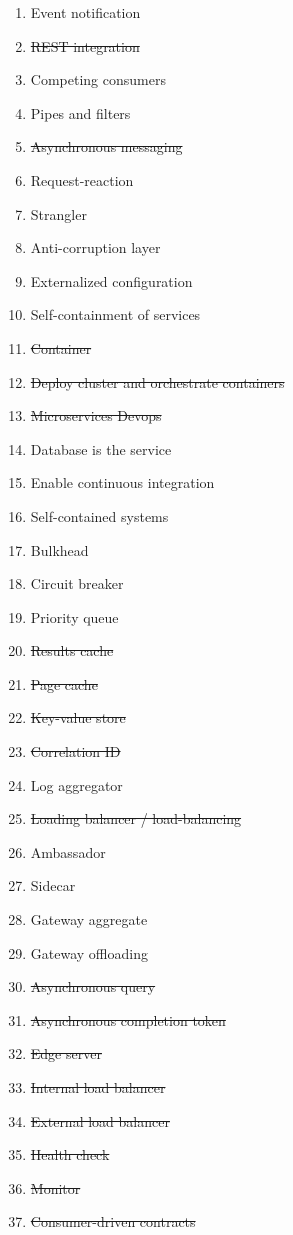 \documentclass{article}
\theoremstyle{mytheoremstyle}
\theoremstyle{mytheoremstyle}
\theoremstyle{myproblemstyle}
\begin{document}
\begin{enumerate}
  \item Event notification 
  \item \sout{REST integration} 
  \item Competing consumers 
  \item Pipes and filters 
  \item \sout{Asynchronous messaging} 
  \item Request-reaction 
  \item Strangler 
  \item Anti-corruption layer 
  \item Externalized configuration 
  \item Self-containment of services
  \item \sout{Container} 
  \item \sout{Deploy cluster and orchestrate containers} 
  \item \sout{Microservices Devops} 
  \item Database is the service
  \item Enable continuous integration 
  \item Self-contained systems 
  \item Bulkhead 
  \item Circuit breaker 
  \item Priority queue 
  \item \sout{Results cache} 
  \item \sout{Page cache} 
  \item \sout{Key-value store} 
  \item \sout{Correlation ID} 
  \item Log aggregator 
  \item \sout{Loading balancer / load-balancing}  
  \item Ambassador 
  \item Sidecar 
  \item Gateway aggregate 
  \item Gateway offloading 
  \item \sout{Asynchronous query} 
  \item \sout{Asynchronous completion token}
  \item \sout{Edge server} 
  \item \sout{Internal load balancer} 
  \item \sout{External load balancer}
  \item \sout{Health check} 
  \item \sout{Monitor} 
  \item \sout{Consumer-driven contracts} 

\end{enumerate}
\end{document}
